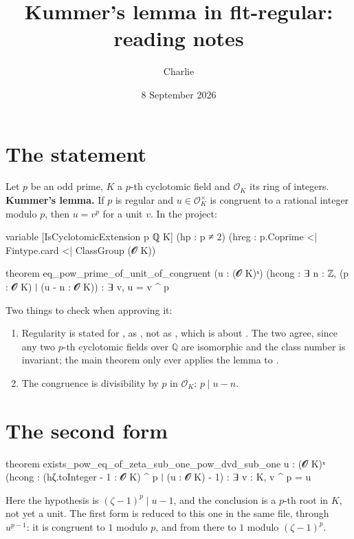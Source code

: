 
\title{\bfseries Kummer's lemma in flt-regular:\\ reading notes}
\author{Charlie}
\date{8 September 2026}

\maketitle
\thispagestyle{empty}

\section{The statement}

Let $p$ be an odd prime, $K$ a $p$-th cyclotomic field and $\mathcal{O}_K$ its ring of integers.
\textbf{Kummer's lemma.} If $p$ is regular and $u \in \mathcal{O}_K^\times$ is congruent to a
rational integer modulo $p$, then $u = v^p$ for a unit $v$. In the project:
\begin{code}
variable [IsCyclotomicExtension {p} ℚ K] (hp : p ≠ 2)
  (hreg : p.Coprime <| Fintype.card <| ClassGroup (𝓞 K))

theorem eq_pow_prime_of_unit_of_congruent (u : (𝓞 K)ˣ)
    (hcong : ∃ n : ℤ, (p : 𝓞 K) ∣ (u - n : 𝓞 K)) :
    ∃ v, u = v ^ p
\end{code}
Two things to check when approving it:
\begin{enumerate}
\item Regularity is stated for , as ,
  not as , which is about . The two agree, since
  any two $p$-th cyclotomic fields over $\mathbb{Q}$ are isomorphic and the class number is
  invariant; the main theorem only ever applies the lemma to .
\item The congruence is divisibility by $p$ in $\mathcal{O}_K$: $p \mid u - n$.
\end{enumerate}

\section{The second form}

\begin{code}
theorem exists_pow_eq_of_zeta_sub_one_pow_dvd_sub_one {u : (𝓞 K)ˣ}
    (hcong : (hζ.toInteger - 1 : 𝓞 K) ^ p ∣ (u : 𝓞 K) - 1) :
    ∃ v : K, v ^ p = u
\end{code}
Here the hypothesis is $(\zeta - 1)^p \mid u - 1$, and the conclusion is a $p$-th root in $K$, not
yet a unit. The first form is reduced to this one in the same file, through $u^{p-1}$: it is
congruent to $1$ modulo $p$, and from there to $1$ modulo $(\zeta - 1)^p$.


